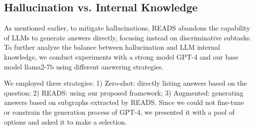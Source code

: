 \documentclass[11pt]{article}
\begin{document}







\subsection{Hallucination vs. Internal Knowledge}
\label{sec:gpt4}

As mentioned earlier, to mitigate hallucinations, READS abandons the capability of LLMs to generate answers directly, focusing instead on discriminative subtasks. To further analyze the balance between hallucination and LLM internal knowledge, we conduct experiments with a strong model GPT-4 and our base model llama2-7b using different answering strategies.

We employed three strategies: 1) Zero-shot: directly listing answers based on the question; 2) READS: using our proposed framework; 3) Augmented: generating answers based on subgraphs extracted by READS. Since we could not fine-tune or constrain the generation process of GPT-4, we presented it with a pool of options and asked it to make a selection. 
\end{document}
